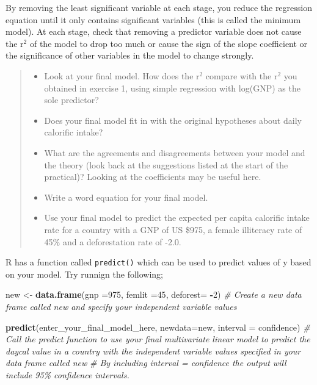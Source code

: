 \documentclass[
]{book}
\newenvironment{Shaded}{\begin{snugshade}}{\end{snugshade}}
\newcommand{\AttributeTok}[1]{\textcolor[rgb]{0.13,0.29,0.53}{#1}}
\newcommand{\CommentTok}[1]{\textcolor[rgb]{0.56,0.35,0.01}{\textit{#1}}}
\newcommand{\DecValTok}[1]{\textcolor[rgb]{0.00,0.00,0.81}{#1}}
\newcommand{\FunctionTok}[1]{\textcolor[rgb]{0.13,0.29,0.53}{\textbf{#1}}}
\newcommand{\NormalTok}[1]{#1}
\newcommand{\OtherTok}[1]{\textcolor[rgb]{0.56,0.35,0.01}{#1}}
\newcommand{\SpecialCharTok}[1]{\textcolor[rgb]{0.81,0.36,0.00}{\textbf{#1}}}
\newcommand{\StringTok}[1]{\textcolor[rgb]{0.31,0.60,0.02}{#1}}
\providecommand{\tightlist}{%
  \setlength{\itemsep}{0pt}\setlength{\parskip}{0pt}}
\begin{document}
By removing the least significant variable at each stage, you reduce the regression equation until it only contains significant variables (this is called the minimum model). At each stage, check that removing a predictor variable does not cause the r\(^2\) of the model to drop too much or cause the sign of the slope coefficient or the significance of other variables in the model to change strongly.

\begin{quote}
\begin{itemize}
\tightlist
\item
  Look at your final model. How does the r\(^2\) compare with the r\(^2\) you obtained in exercise 1, using simple regression with log(GNP) as the sole predictor?
\item
  Does your final model fit in with the original hypotheses about daily calorific intake?
\item
  What are the agreements and disagreements between your model and the theory (look back at the suggestions listed at the start of the practical)? Looking at the coefficients may be useful here.
\item
  Write a word equation for your final model.
\item
  Use your final model to predict the expected per capita calorific intake rate for a country with a GNP of US \$975, a female illiteracy rate of 45\% and a deforestation rate of -2.0.
\end{itemize}
\end{quote}

R has a function called \texttt{predict()} which can be used to predict values of y based on your model. Try runnign the following;

\begin{Shaded}
\begin{Highlighting}[]
\NormalTok{new }\OtherTok{\textless{}{-}} \FunctionTok{data.frame}\NormalTok{(}\AttributeTok{gnp =}\DecValTok{975}\NormalTok{, }\AttributeTok{femlit =}\DecValTok{45}\NormalTok{, }\AttributeTok{deforest=} \SpecialCharTok{{-}}\DecValTok{2}\NormalTok{)}
\CommentTok{\# Create a new data frame called \textasciigrave{}new\textasciigrave{} and specify your independent variable values}

\FunctionTok{predict}\NormalTok{(enter\_your\_final\_model\_here, }\AttributeTok{newdata=}\NormalTok{new, }\AttributeTok{interval =} \StringTok{\textquotesingle{}confidence\textquotesingle{}}\NormalTok{)}
\CommentTok{\# Call the predict function to use your final multivariate linear model to predict the daycal value in a country with the independent variable values specified in your data frame called \textasciigrave{}new\textasciigrave{}}
\CommentTok{\# By including interval = \textquotesingle{}confidence\textquotesingle{} the output will include 95\% confidence intervals.}
\end{Highlighting}
\end{Shaded}
\end{document}
